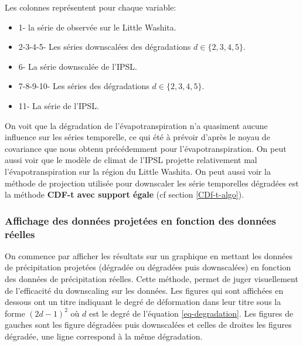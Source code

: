 \documentclass[a4paper,11pt]{article}
\begin{document}
Les colonnes représentent pour chaque variable:
\begin{itemize}
	\item 1- la série de observée sur le Little Washita. 
	\item 2-3-4-5- Les séries downscalées des dégradations $d \in \{2,3,4,5\}$.
	\item 6- La série downscalée de l'IPSL. 
	\item 7-8-9-10- Les séries des dégradations $d \in \{2,3,4,5\}$.
	\item 11- La série de l'IPSL. 
\end{itemize}
On voit que la dégradation de l'évapotranspiration n'a quasiment aucune influence sur les séries temporelle, ce qui été à prévoir d'après le noyau de covariance que nous obtenu précédemment pour l'évapotranspiration. On peut aussi voir que le modèle de climat de l'IPSL projette relativement mal l'évapotranspiration sur la région du Little Washita. On peut aussi voir la méthode de projection utilisée pour downscaler les série temporelles dégradées est la méthode  \textbf{CDF-t avec support égale} (cf section \ref{CDf-t-algo}). 

\subsubsection{Affichage des données projetées en fonction des données réelles}
\label{ch:plot-dswnsc/deg}
On commence par afficher les résultats sur un graphique en mettant les données de précipitation projetées (dégradée ou dégradées puis downscalées) en fonction des données de précipitation réelles. Cette méthode, permet de juger visuellement de l'efficacité du downscaling sur les données. Les figures qui sont affichées en dessous ont un titre indiquant le degré de déformation dans leur titre sous la forme $(2d-1)^2$ où $d$ est le degré de l'équation \eqref{eq-degradation}. Les figures de gauches sont les figure dégradées puis downscalées et celles de droites les figures dégradée, une ligne correspond à la même dégradation.	

\vspace{0.7cm}
\end{document}
